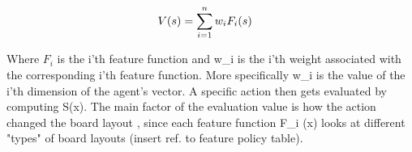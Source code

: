 \begin{align*}
V (s ) &= \sum_{i=1}^{n} w _{i}F _{i}(s )
\end{align*}

Where $F_i$ is the i'th feature function and w\_i is the i'th weight associated with the corresponding i'th feature function. More specifically w\_i is the value of the i'th dimension of the agent's vector.
A specific action then gets evaluated by computing S(x). The main factor of the evaluation value is how the action changed the board layout , since each feature function F\_i (x) looks at different "types" of board layouts (insert ref. to feature policy table).
